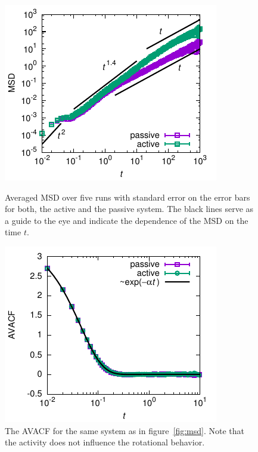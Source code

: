 \documentclass[aip,jcp,reprint,a4paper,onecolumn,nofootinbib,amsmath,amssymb]{revtex4-1}
\begin{document}
\begin{figure}[tb]
  \centering
  \leavevmode\hfill
  \begin{minipage}[t]{.45\linewidth}
    \centering
    \includegraphics{FIGURES/msd}
    \caption{Averaged MSD over five runs with standard error on the
      error bars for both, the active and the passive system. The
      black lines serve as a guide to the eye and indicate the
      dependence of the MSD on the time $t$.}
    \label{fig:msd}
  \end{minipage}
  \hfill
  \begin{minipage}[t]{.45\linewidth}
    \centering
    \includegraphics{FIGURES/avacf}
    \caption{The AVACF for the same system as in
      figure~\ref{fig:msd}. Note that the activity does not influence
      the rotational behavior.}
    \label{fig:avacf}
  \end{minipage}
  \hfill\null
\end{figure}
\end{document}
